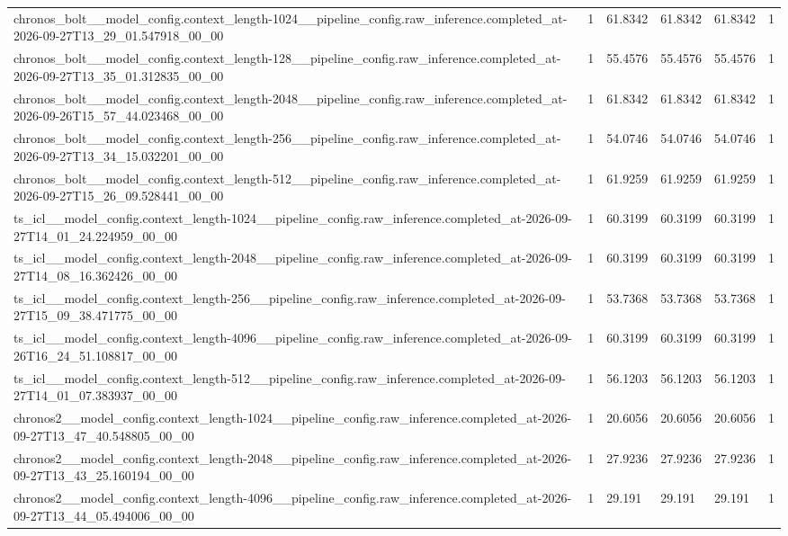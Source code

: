 \begin{tabular}{llllll}
chronos\_bolt\_\_model\_config.context\_length-1024\_\_pipeline\_config.raw\_inference.completed\_at-2026-09-27T13\_29\_01.547918\_00\_00 & 1 & 61.8342 & 61.8342 & 61.8342 & 1 \\
chronos\_bolt\_\_model\_config.context\_length-128\_\_pipeline\_config.raw\_inference.completed\_at-2026-09-27T13\_35\_01.312835\_00\_00 & 1 & 55.4576 & 55.4576 & 55.4576 & 1 \\
chronos\_bolt\_\_model\_config.context\_length-2048\_\_pipeline\_config.raw\_inference.completed\_at-2026-09-26T15\_57\_44.023468\_00\_00 & 1 & 61.8342 & 61.8342 & 61.8342 & 1 \\
chronos\_bolt\_\_model\_config.context\_length-256\_\_pipeline\_config.raw\_inference.completed\_at-2026-09-27T13\_34\_15.032201\_00\_00 & 1 & 54.0746 & 54.0746 & 54.0746 & 1 \\
chronos\_bolt\_\_model\_config.context\_length-512\_\_pipeline\_config.raw\_inference.completed\_at-2026-09-27T15\_26\_09.528441\_00\_00 & 1 & 61.9259 & 61.9259 & 61.9259 & 1 \\
ts\_icl\_\_model\_config.context\_length-1024\_\_pipeline\_config.raw\_inference.completed\_at-2026-09-27T14\_01\_24.224959\_00\_00 & 1 & 60.3199 & 60.3199 & 60.3199 & 1 \\
ts\_icl\_\_model\_config.context\_length-2048\_\_pipeline\_config.raw\_inference.completed\_at-2026-09-27T14\_08\_16.362426\_00\_00 & 1 & 60.3199 & 60.3199 & 60.3199 & 1 \\
ts\_icl\_\_model\_config.context\_length-256\_\_pipeline\_config.raw\_inference.completed\_at-2026-09-27T15\_09\_38.471775\_00\_00 & 1 & 53.7368 & 53.7368 & 53.7368 & 1 \\
ts\_icl\_\_model\_config.context\_length-4096\_\_pipeline\_config.raw\_inference.completed\_at-2026-09-26T16\_24\_51.108817\_00\_00 & 1 & 60.3199 & 60.3199 & 60.3199 & 1 \\
ts\_icl\_\_model\_config.context\_length-512\_\_pipeline\_config.raw\_inference.completed\_at-2026-09-27T14\_01\_07.383937\_00\_00 & 1 & 56.1203 & 56.1203 & 56.1203 & 1 \\
chronos2\_\_model\_config.context\_length-1024\_\_pipeline\_config.raw\_inference.completed\_at-2026-09-27T13\_47\_40.548805\_00\_00 & 1 & 20.6056 & 20.6056 & 20.6056 & 1 \\
chronos2\_\_model\_config.context\_length-2048\_\_pipeline\_config.raw\_inference.completed\_at-2026-09-27T13\_43\_25.160194\_00\_00 & 1 & 27.9236 & 27.9236 & 27.9236 & 1 \\
chronos2\_\_model\_config.context\_length-4096\_\_pipeline\_config.raw\_inference.completed\_at-2026-09-27T13\_44\_05.494006\_00\_00 & 1 & 29.191 & 29.191 & 29.191 & 1 \\

\end{tabular}
